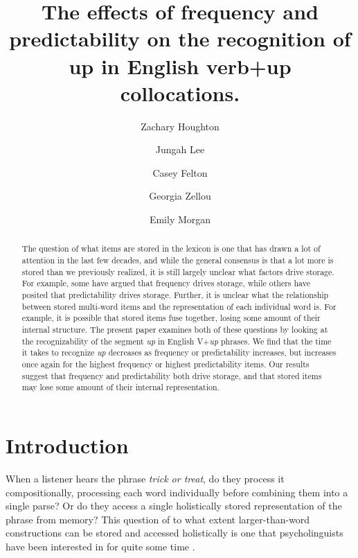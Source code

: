 \documentclass[
  authoryear,
  preprint,
  1p,
  onecolumn]{elsarticle}
\begin{document}
\begin{frontmatter}
\title{The effects of frequency and predictability on the recognition of
up in English verb+up collocations.}
\author[1]{Zachary Houghton%
%
}
\author[2]{Jungah Lee%
%
}

\author[1]{Casey Felton%
%
}

\author[1]{Georgia Zellou%
%
}

\author[1]{Emily Morgan%
%
}








        
\begin{abstract}
The question of what items are stored in the lexicon is one that has
drawn a lot of attention in the last few decades, and while the general
consensus is that a lot more is stored than we previously realized, it
is still largely unclear what factors drive storage. For example, some
have argued that frequency drives storage, while others have posited
that predictability drives storage. Further, it is unclear what the
relationship between stored multi-word items and the representation of
each individual word is. For example, it is possible that stored items
fuse together, losing some amount of their internal structure. The
present paper examines both of these questions by looking at the
recognizability of the segment \emph{up} in English V+\emph{up} phrases.
We find that the time it takes to recognize \emph{up} decreases as
frequency or predictability increases, but increases once again for the
highest frequency or highest predictability items. Our results suggest
that frequency and predictability both drive storage, and that stored
items may lose some amount of their internal representation.
\end{abstract}





\end{frontmatter}
    

\section{Introduction}\label{introduction}

When a listener hears the phrase \emph{trick or treat}, do they process
it compositionally, processing each word individually before combining
them into a single parse? Or do they access a single holistically stored
representation of the phrase from memory? This question of to what
extent larger-than-word constructions can be stored and accessed
holistically is one that psycholinguists have been interested in for
quite some time
\citep[e.g.,][]{bybee2002, bybee2003, goldberg2003, nooteboom2002, stembergerFrequencyLexicalStorage1986, stemberger2004}.
\end{document}
